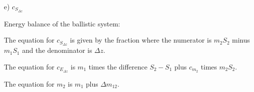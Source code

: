 e) \(c_{S_{\Delta z}}\)

Energy balance of the ballistic system:

The equation for \(c_{S_{\Delta z}}\) is given by the fraction where the numerator is \(m_2 S_2\) minus \(m_1 S_1\) and the denominator is \(\Delta z\).

The equation for \(c_{E_{\Delta z}}\) is \(m_1\) times the difference \(S_2 - S_1\) plus \(c_{m_2}\) times \(m_2 S_2\).

The equation for \(m_2\) is \(m_1\) plus \(\Delta m_{12}\).